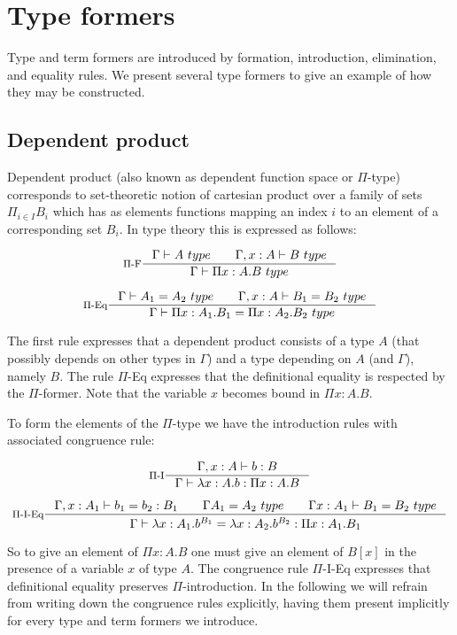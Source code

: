 \section*{Type formers}

Type and term formers are introduced by formation, introduction, elimination,
and equality rules. We present several type formers to give an example of how
they may be constructed.

\subsection*{Dependent product}

Dependent product (also known as dependent function space or $\Pi$-type)
corresponds to set-theoretic notion of cartesian product over a family of sets
$\Pi_{i \in I}B_i$ which has as elements functions mapping an index $i$ to an
element of a corresponding set $B_i$. In type theory this is expressed as
follows:

\[
  \inference[$\Pi$-F]{\Gamma \vdash A~type \qquad \Gamma, x:A \vdash B~type}{\Gamma \vdash \Pi x:A. B~type}
\]

\[
  \inference[$\Pi$-Eq]{\Gamma \vdash A_1 = A_2 ~type \qquad \Gamma, x:A \vdash B_1 = B_2 ~type}{\Gamma \vdash \Pi x:A_1. B_1 = \Pi x:A_2. B_2~type}
\]

The first rule expresses that a dependent product consists of a type $A$ (that
possibly depends on other types in $\Gamma$) and a type depending on $A$ (and
$\Gamma$), namely $B$. The rule $\Pi$-Eq expresses that the definitional
equality is respected by the $\Pi$-former. Note that the variable $x$ becomes
bound in $\Pi x:A. B$.

To form the elements of the $\Pi$-type we have the introduction rules with
associated congruence rule:

\[
  \inference[$\Pi$-I]{\Gamma, x:A \vdash b : B}{\Gamma \vdash \lambda x : A. b : \Pi x:A. B}
\]

\[
  \inference[$\Pi$-I-Eq]{\Gamma, x:A_1 \vdash b_1 = b_2 : B_1 \qquad \Gamma A_1 = A_2~type \qquad \Gamma x: A_1 \vdash B_1 = B_2~type}{\Gamma \vdash \lambda x : A_1. b^{B_1} = \lambda x : A_2. b^{B_2} : \Pi x:A_1. B_1}
\]

So to give an element of $\Pi x:A. B$ one must give an element of $B[x]$ in the
presence of a variable $x$ of type $A$. The congruence rule $\Pi$-I-Eq
expresses that definitional equality preserves $\Pi$-introduction. In the
following we will refrain from writing down the congruence rules explicitly,
having them present implicitly for every type and term formers we introduce.

